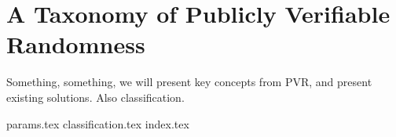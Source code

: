 \section{A Taxonomy of Publicly Verifiable Randomness}
\label{sec:a_taxonomy_of_publicly_verifiable_randomness}
Something, something, we will present key concepts from PVR, and present existing solutions.
Also classification.

{params.tex}
{classification.tex}
{index.tex}
